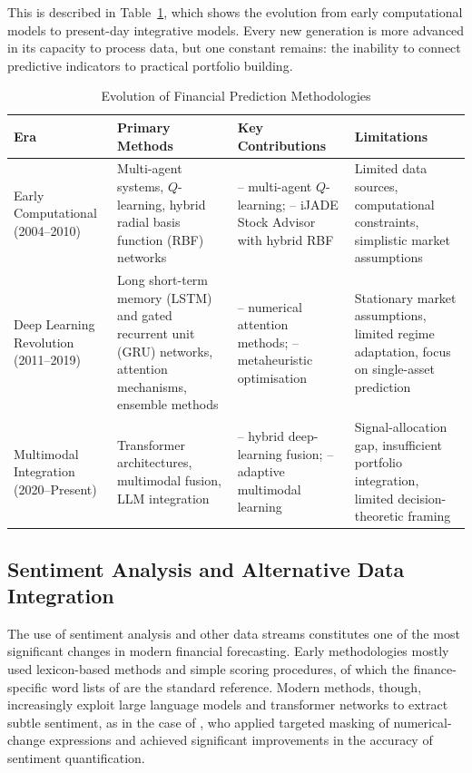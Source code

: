 This is described in Table~\ref{tab:evolution}, which shows the evolution from early
computational models to present-day integrative models. Every new generation is more
advanced in its capacity to process data, but one constant remains: the inability to
connect predictive indicators to practical portfolio building.

\begin{table}[!ht]
\centering
\caption{Evolution of Financial Prediction Methodologies}
\label{tab:evolution}
\footnotesize
\begin{tabular}{p{2.5cm}p{2.5cm}p{2.5cm}p{2.5cm}}
\hline
\textbf{Era} & \textbf{Primary Methods} & \textbf{Key Contributions} & \textbf{Limitations} \\
\hline
Early Computational (2004--2010) & Multi-agent systems, $Q$-learning, hybrid radial basis function (RBF) networks & \citet{lee07} -- multi-agent $Q$-learning; \citet{lee04} -- iJADE Stock Advisor with hybrid RBF & Limited data sources, computational constraints, simplistic market assumptions \\
\hline
Deep Learning Revolution (2011--2019) & Long short-term memory (LSTM) and gated recurrent unit (GRU) networks, attention mechanisms, ensemble methods & \citet{liu19} -- numerical attention methods; \citet{chou18} -- metaheuristic optimisation & Stationary market assumptions, limited regime adaptation, focus on single-asset prediction \\
\hline
Multimodal Integration (2020--Present) & Transformer architectures, multimodal fusion, LLM integration & \citet{moodi24} -- hybrid deep-learning fusion; \citet{farimani24} -- adaptive multimodal learning & Signal-allocation gap, insufficient portfolio integration, limited decision-theoretic framing \\
\hline
\end{tabular}
\end{table}

\subsection{Sentiment Analysis and Alternative Data Integration}

The use of sentiment analysis and other data streams constitutes one of the most
significant changes in modern financial forecasting. Early methodologies mostly used
lexicon-based methods and simple scoring procedures, of which the finance-specific word
lists of \citet{loughran11} are the standard reference. Modern methods, though,
increasingly exploit large language models and transformer networks to extract subtle
sentiment, as in the case of \citet{jung24}, who applied targeted masking of
numerical-change expressions and achieved significant improvements in the accuracy of
sentiment quantification.

